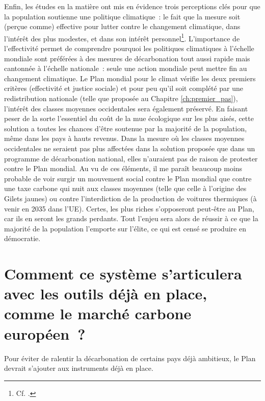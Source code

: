 \documentclass[a5paper,french]{memoir}
\begin{document}
Enfin, les études en la matière ont mis en évidence trois perceptions clés pour que la population soutienne une politique climatique~: le fait que la mesure soit (perçue comme) effective pour lutter contre le changement climatique, dans l'intérêt des plus modestes, et dans son intérêt personnel\footnote{Cf. \cite{dechezlepretre_fighting_2022}.}. L'importance de l'effectivité permet de comprendre pourquoi les politiques climatiques à l'échelle mondiale sont préférées à des mesures de décarbonation tout aussi rapide mais cantonnée à l'échelle nationale~: seule une action mondiale peut mettre fin au changement climatique. Le Plan mondial pour le climat vérifie les deux premiers critères (effectivité et justice sociale) et pour peu qu'il soit complété par une redistribution nationale (telle que proposée au Chapitre \ref{ch:premier_pas}), l'intérêt des classes moyennes occidentales sera également préservé. En faisant peser de la sorte l'essentiel du coût de la mue écologique sur les plus aisés, cette solution a toutes les chances d'être soutenue par la majorité de la population, même dans les pays à hauts revenus. Dans la mesure où les classes moyennes occidentales ne seraient pas plus affectées dans la solution proposée que dans un programme de décarbonation national, elles n'auraient pas de raison de protester contre le Plan mondial. Au vu de ces éléments, il me paraît beaucoup moins probable de voir surgir un mouvement social contre le Plan mondial que contre une taxe carbone qui nuit aux classes moyennes (telle que celle à l'origine des Gilets jaunes) ou contre l'interdiction de la production de voitures thermiques (à venir en 2035 dans l'UE). Certes, les plus riches s'opposeront peut-être au Plan, car ils en seront les grands perdants. Tout l'enjeu sera alors de réussir à ce que la majorité de la population l'emporte sur l'élite, ce qui est censé se produire en démocratie.

\section*{\normalsize Comment ce système s'articulera avec les outils déjà en place, comme le marché carbone européen~?}\label{q:ets}

Pour éviter de ralentir la décarbonation de certains pays déjà ambitieux, le Plan devrait s'ajouter aux instruments déjà en place. 
\end{document}
